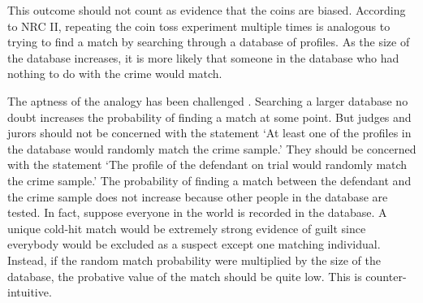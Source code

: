 \documentclass{article}
\begin{document}
This outcome should not count as evidence that the coins are biased. According to NRC II, repeating the coin toss experiment multiple times is analogous to trying to find a match by searching through a database of profiles.  As the size of the database increases,  %
 it is more likely that someone in the database who had nothing to do with the crime would  match.
%
%
%

The aptness of the analogy has been challenged   \citep{donnelly1999DNADatabaseSearches}. Searching a larger database no doubt increases the probability of finding a match at some point. But judges and jurors should not be concerned with %
the statement
`At least one of the profiles in the database %
would randomly match the crime sample.' %
% 
%
They should be concerned with %
the statement `The profile of the  defendant on trial would randomly match the crime sample.' The probability of finding a match between the  defendant and the crime sample does not increase because other people in the database are tested. In fact, suppose everyone in the world is recorded in the database. A unique cold-hit match would be extremely strong evidence of guilt since everybody would be excluded as a suspect except one matching individual. Instead, if the random match probability were multiplied by the size of the database, the probative value of the match should be quite low. This is counter-intuitive.%
\end{document}

